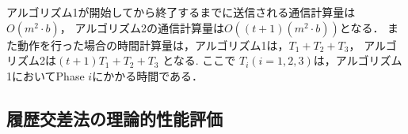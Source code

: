 \documentclass[a4paper,12pt]{jsarticle}
\begin{document}




アルゴリズム1が開始してから終了するまでに送信される通信計算量は$O(m^2 \cdot b)$，
アルゴリズム2の通信計算量は$O((t+1)(m^2 \cdot b))$となる．
また動作を行った場合の時間計算量は，アルゴリズム1は，$ T_1 + T_2 + T_3 $，
アルゴリズム2は$ ( t + 1 ) T_1 + T_2 + T_3 $ となる. 
ここで $T_i (i=1, 2, 3)$は，アルゴリズム 1においてPhase $i$にかかる時間である．

\newpage
%

\subsection{履歴交差法の理論的性能評価}
\end{document}
